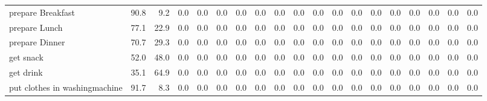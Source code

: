 \documentclass{article}
\begin{document}
\begin{sideways}
\begin{tabular}{lrrrrrrrrrrrrrrrrrr}
prepare Breakfast             &        90.8 &                9.2 &           0.0 &                          0.0 &                0.0 &                0.0 &                        0.0 &          0.0 &              0.0 &                0.0 &                    0.0 &                      0.0 &                  0.0 &                   0.0 &              0.0 &              0.0 &                                  0.0 &          0.0 \\
prepare Lunch                 &        77.1 &               22.9 &           0.0 &                          0.0 &                0.0 &                0.0 &                        0.0 &          0.0 &              0.0 &                0.0 &                    0.0 &                      0.0 &                  0.0 &                   0.0 &              0.0 &              0.0 &                                  0.0 &          0.0 \\
prepare Dinner                &        70.7 &               29.3 &           0.0 &                          0.0 &                0.0 &                0.0 &                        0.0 &          0.0 &              0.0 &                0.0 &                    0.0 &                      0.0 &                  0.0 &                   0.0 &              0.0 &              0.0 &                                  0.0 &          0.0 \\
get snack                     &        52.0 &               48.0 &           0.0 &                          0.0 &                0.0 &                0.0 &                        0.0 &          0.0 &              0.0 &                0.0 &                    0.0 &                      0.0 &                  0.0 &                   0.0 &              0.0 &              0.0 &                                  0.0 &          0.0 \\
get drink                     &        35.1 &               64.9 &           0.0 &                          0.0 &                0.0 &                0.0 &                        0.0 &          0.0 &              0.0 &                0.0 &                    0.0 &                      0.0 &                  0.0 &                   0.0 &              0.0 &              0.0 &                                  0.0 &          0.0 \\
put clothes in washingmachine &        91.7 &                8.3 &           0.0 &                          0.0 &                0.0 &                0.0 &                        0.0 &          0.0 &              0.0 &                0.0 &                    0.0 &                      0.0 &                  0.0 &                   0.0 &              0.0 &              0.0 &                                  0.0 &          0.0 \\

\end{tabular}
\end{sideways}
\end{document}
